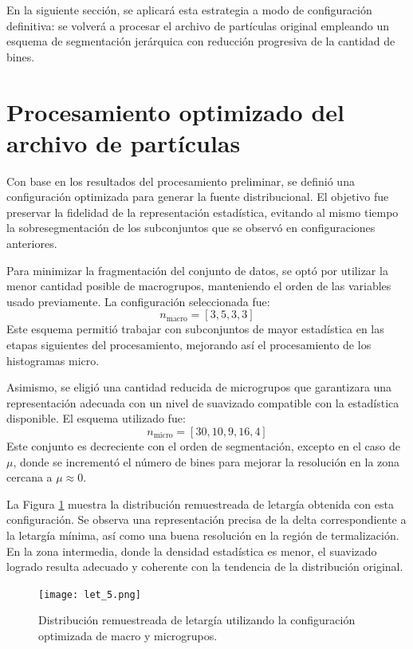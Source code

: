 En la siguiente sección, se aplicará esta estrategia a modo de configuración definitiva: se volverá a procesar el archivo de partículas original empleando un esquema de segmentación jerárquica con reducción progresiva de la cantidad de bines.

\section{Procesamiento optimizado del archivo de partículas}

Con base en los resultados del procesamiento preliminar, se definió una configuración optimizada para generar la fuente distribucional. El objetivo fue preservar la fidelidad de la representación estadística, evitando al mismo tiempo la sobresegmentación de los subconjuntos que se observó en configuraciones anteriores.

Para minimizar la fragmentación del conjunto de datos, se optó por utilizar la menor cantidad posible de macrogrupos, manteniendo el orden de las variables usado previamente. La configuración seleccionada fue: 
\[
n_\text{macro} = [3, 5, 3, 3]
\]
Este esquema permitió trabajar con subconjuntos de mayor estadística en las etapas siguientes del procesamiento, mejorando así el procesamiento de los histogramas micro.

Asimismo, se eligió una cantidad reducida de microgrupos que garantizara una representación adecuada con un nivel de suavizado compatible con la estadística disponible. El esquema utilizado fue:
\[
n_\text{micro} = [30, 10, 9, 16, 4]
\]
Este conjunto es decreciente con el orden de segmentación, excepto en el caso de $\mu$, donde se incrementó el número de bines para mejorar la resolución en la zona cercana a $\mu \approx 0$.


La Figura \ref{fig:let_5} muestra la distribución remuestreada de letargía obtenida con esta configuración. Se observa una representación precisa de la delta correspondiente a la letargía mínima, así como una buena resolución en la región de termalización. En la zona intermedia, donde la densidad estadística es menor, el suavizado logrado resulta adecuado y coherente con la tendencia de la distribución original.

\begin{figure}[H]
    \centering
    \texttt{[image: let\_5.png]}
    \caption{Distribución remuestreada de letargía utilizando la configuración optimizada de macro y microgrupos.}
    \label{fig:let_5}
\end{figure}


